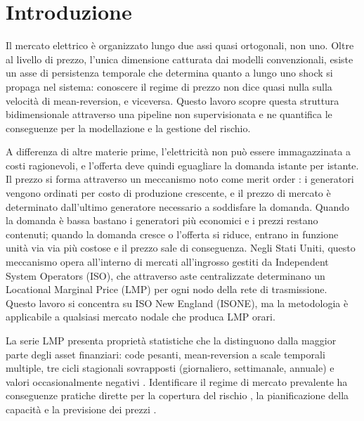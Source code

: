 \documentclass[12pt]{article}
\begin{document}
\section{Introduzione}
\label{sec:introduction}

Il mercato elettrico è organizzato lungo due assi quasi ortogonali, non uno.
Oltre al livello di prezzo, l'unica dimensione catturata dai modelli convenzionali, esiste un asse di persistenza temporale che determina quanto a lungo uno shock si propaga nel sistema: conoscere il regime di prezzo non dice quasi nulla sulla velocità di mean-reversion, e viceversa.
Questo lavoro scopre questa struttura bidimensionale attraverso una pipeline non supervisionata e ne quantifica le conseguenze per la modellazione e la gestione del rischio.


A differenza di altre materie prime, l'elettricità non può essere immagazzinata a costi ragionevoli, e l'offerta deve quindi eguagliare la domanda istante per istante.
Il prezzo si forma attraverso un meccanismo noto come merit order \citep{weron2014}: i generatori vengono ordinati per costo di produzione crescente, e il prezzo di mercato è determinato dall'ultimo generatore necessario a soddisfare la domanda.
Quando la domanda è bassa bastano i generatori più economici e i prezzi restano contenuti; quando la domanda cresce o l'offerta si riduce, entrano in funzione unità via via più costose e il prezzo sale di conseguenza.
Negli Stati Uniti, questo meccanismo opera all'interno di mercati all'ingrosso gestiti da Independent System Operators (ISO), che attraverso aste centralizzate determinano un Locational Marginal Price (LMP) per ogni nodo della rete di trasmissione.
Questo lavoro si concentra su ISO New England (ISONE), ma la metodologia è applicabile a qualsiasi mercato nodale che produca LMP orari.

La serie LMP presenta proprietà statistiche che la distinguono dalla maggior parte degli asset finanziari: code pesanti, mean-reversion a scale temporali multiple, tre cicli stagionali sovrapposti (giornaliero, settimanale, annuale) e valori occasionalmente negativi \citep{ziel2018, weron2006}.
Identificare il regime di mercato prevalente ha conseguenze pratiche dirette per la copertura del rischio \citep{coulon2014}, la pianificazione della capacità e la previsione dei prezzi \citep{janczura2013, nowotarski2018}.

\end{document}

